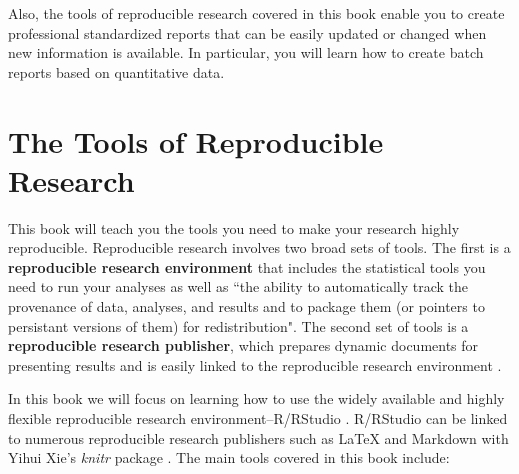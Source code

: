 \documentclass[krantz1]{krantz}
\begin{document}
Also, the tools of reproducible research covered in this book enable you to create professional standardized reports that can be easily updated or changed when new information is available. In particular, you will learn how to create batch reports based on quantitative data.


\section{The Tools of Reproducible Research}

This book will teach you the tools you need to make your research highly reproducible. Reproducible research involves two broad sets of tools. The first is a {\bf{reproducible research environment}} that includes the statistical tools you need to run your analyses as well as ``the ability to automatically track the provenance of data, analyses, and results and to package them (or pointers to persistant versions of them) for redistribution". The second set of tools is a {\bf{reproducible research publisher}}, which prepares dynamic documents for presenting results and is easily linked to the reproducible research environment \cite[415]{Mesirov2010}.

In this book we will focus on learning how to use the widely available and highly flexible reproducible research environment--R/RStudio \cite[]{RLanguage,RStudioCite}. R/RStudio can be linked to numerous reproducible research publishers such as LaTeX and Markdown with Yihui Xie's {\emph{knitr}} package \citeyearpar{R-knitr}. The main tools covered in this book include:
\end{document}
